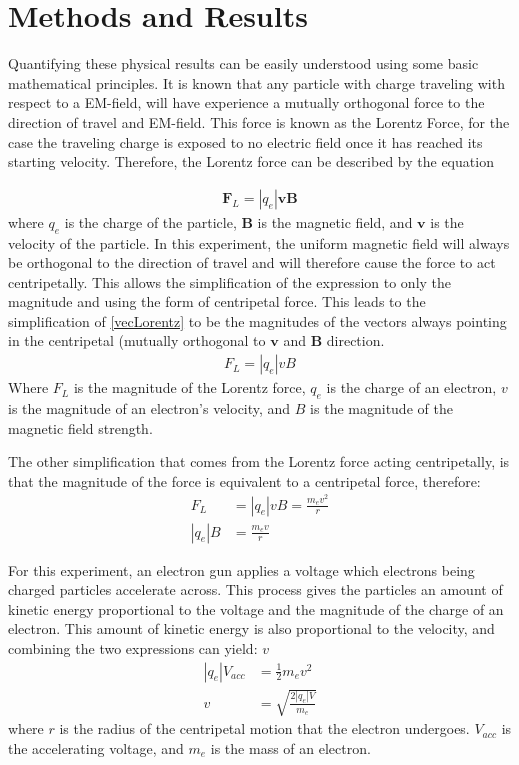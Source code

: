 \documentclass[rc]{physicsinprogress}
\begin{document}
\section{Methods and Results}
Quantifying these physical results can be easily understood using some basic mathematical principles. 
It is known that any particle with charge traveling with respect to a EM-field, will have experience a mutually orthogonal force to the direction of travel and EM-field. This force is known as the Lorentz Force, for the case the traveling charge is exposed to no electric field once it has reached its starting velocity. Therefore, the Lorentz force can be described by the equation

\begin{align}
     \boldsymbol{F}_L = |q_e|\boldsymbol{v}\boldsymbol{B}
     \label{vecLorentz}
\end{align}
where $q_e$ is the charge of the particle, $\boldsymbol{B}$ is the magnetic field, and $\boldsymbol{v}$ is the velocity of the particle.
In this experiment, the uniform magnetic field will always be orthogonal to the direction of travel and will therefore cause the force to act centripetally. 
This allows the simplification of the expression to only the magnitude and using the form of centripetal force. This leads to the simplification of \eqref{vecLorentz} to be the magnitudes of the vectors always pointing in the centripetal (mutually orthogonal to $\boldsymbol{v}$ and $\boldsymbol{B}$ direction.
\begin{align}
   {F_L} = |q_e|{v}{B}
   \label{magLorentz}
\end{align}
Where $F_L$ is the magnitude of the Lorentz force, $q_e$ is the charge of an electron, $v$ is the magnitude of an electron's velocity, and $B$ is the magnitude of the magnetic field strength. 

The other simplification that comes from the Lorentz force acting centripetally, is that the magnitude of the force is equivalent to a centripetal force, therefore:
\begin{align}
    F_L &= |q_e|vB = \frac{m_ev^2}{r} \\
    |q_e|B &= \frac{m_ev}{r}   
\end{align}

 
For this experiment, an electron gun applies a voltage which electrons being charged particles accelerate across. This process gives the particles an amount of kinetic energy proportional to the voltage and the magnitude of the charge of an electron. This amount of kinetic energy is also proportional to the velocity, and combining the two expressions can yield: $v$
\begin{align}
    |q_e|V_{acc} &= \frac{1}{2}m_ev^2 \\
    v &= \sqrt{\frac{2|q_e|V}{m_e}}
\end{align}
where $r$ is the radius of the centripetal motion that the electron undergoes. $V_{acc}$ is the accelerating voltage, and $m_e$ is the mass of an electron. 
\end{document}
